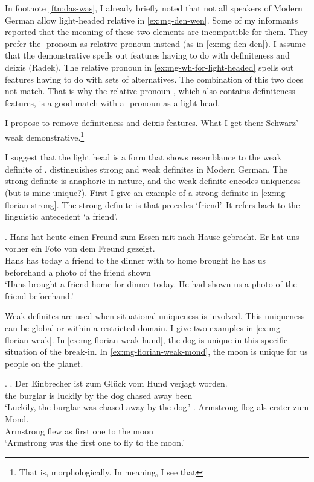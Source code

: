 In footnote \ref{ftn:das-was}, I already briefly noted that not all speakers of Modern German allow light-headed relative in \ref{ex:mg-den-wen}. Some of my informants reported that the meaning of these two elements are incompatible for them. They prefer the -pronoun as relative pronoun instead (as in \ref{ex:mg-den-den}).
I assume that the demonstrative  spells out features having to do with definiteness and deixis (Radek). The relative pronoun  in \ref{ex:mg-wh-for-light-headed} spells out features having to do with sets of alternatives. The combination of this two does not match. That is why the relative pronoun , which also contains definiteness features, is a good match with a -pronoun as a light head.

I propose to remove definiteness and deixis features. What I get then: Schwarz' weak demonstrative.\footnote{
That is, morphologically. In meaning, I see that
}


I suggest that the light head is a form that shows resemblance to the weak definite of \citet{schwarz2009}. \citet{schwarz2009} distinguishes strong and weak definites in Modern German. The strong definite is anaphoric in nature, and the weak definite encodes uniqueness (but is mine unique?). First I give an example of a strong definite in \ref{ex:mg-florian-strong}. The strong definite is  that precedes  `friend'. It refers back to the linguistic antecedent  `a friend'.

\exg. Hans hat heute einen Freund zum Essen mit nach Hause gebracht. Er hat uns vorher ein Foto von dem Freund gezeigt.\\
Hans has today a friend {to the} dinner with to home brought he has us beforehand a photo of the friend shown\\
`Hans brought a friend home for dinner today. He had shown us a photo of the friend beforehand.'\label{ex:mg-florian-strong}

Weak definites are used when situational uniqueness is involved. This uniqueness can be global or within a restricted domain. I give two examples in \ref{ex:mg-florian-weak}. In \ref{ex:mg-florian-weak-hund}, the dog is unique in this specific situation of the break-in. In \ref{ex:mg-florian-weak-mond}, the moon is unique for us people on the planet.

\ex.\label{ex:mg-florian-weak}
\ag. Der Einbrecher ist {zum Glück} vom Hund verjagt worden.\\
the burglar is luckily {by the} dog {chased away} been\\
`Luckily, the burglar was chased away by the dog.'\label{ex:mg-florian-weak-hund}
\bg. Armstrong flog als erster zum Mond.\\
Armstrong flew as {first one} {to the} moon\\
`Armstrong was the first one to fly to the moon.' \label{ex:mg-florian-weak-mond}


